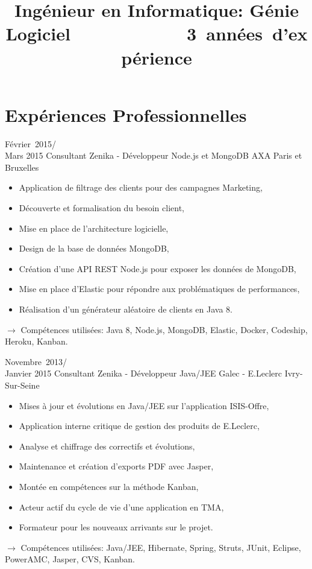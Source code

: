 \documentclass[11pt,a4paper]{moderncv}
\title{Ingénieur en Informatique: Génie Logiciel\newline\mbox{~~~~~~~~~~~~3 années d'expérience}} %
\begin{document}
\maketitle

\section{Expériences Professionnelles}

\cventry
{Février\ 2015/\\Mars 2015}
{Consultant Zenika - Développeur Node.js et MongoDB}
{AXA}
{Paris et Bruxelles}
{}
{\begin{itemize}
\item Application de filtrage des clients pour des campagnes Marketing,
\item Découverte et formalisation du besoin client,
\item Mise en place de l'architecture logicielle,
\item Design de la base de données MongoDB,
\item Création d'une API REST Node.js pour exposer les données de MongoDB,
\item Mise en place d'Elastic pour répondre aux problématiques de performances,
\item Réalisation d'un générateur aléatoire de clients en Java 8.
\end{itemize}
$\rightarrow$ Compétences utilisées: Java 8, Node.js, MongoDB, Elastic, Docker, Codeship, Heroku, Kanban.
}   %

\cventry
{Novembre\ 2013/\\Janvier 2015}
{Consultant Zenika - Développeur Java/JEE}
{Galec - E.Leclerc}
{Ivry-Sur-Seine}
{}
{\begin{itemize}
\item Mises à jour et évolutions en Java/JEE sur l'application ISIS-Offre,
\item Application interne critique de gestion des produits de E.Leclerc,
\item Analyse et chiffrage des correctifs et évolutions,
\item Maintenance et création d'exports PDF avec Jasper,
\item Montée en compétences sur la méthode Kanban,
\item Acteur actif du cycle de vie d'une application en TMA,
\item Formateur pour les nouveaux arrivants sur le projet.
\end{itemize}
$\rightarrow$ Compétences utilisées: Java/JEE, Hibernate, Spring, Struts, JUnit, Eclipse, PowerAMC, Jasper, CVS, Kanban.
}   %
\end{document}

